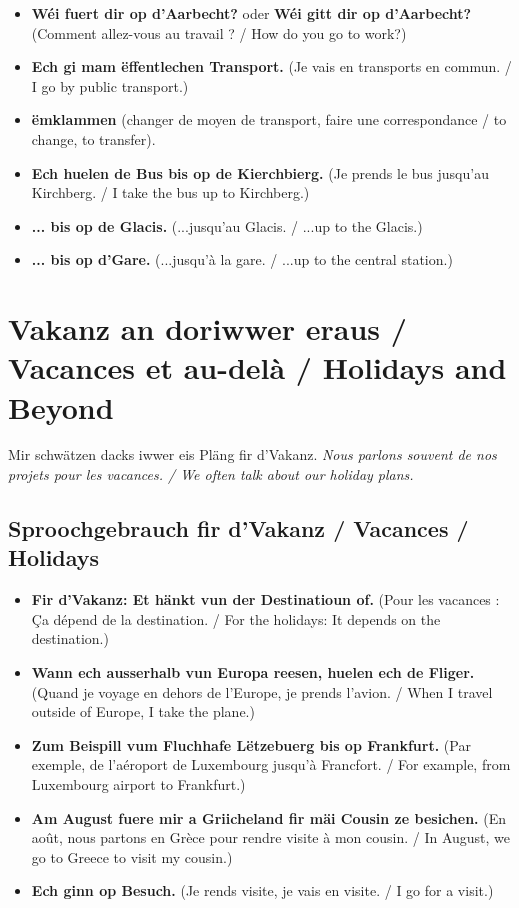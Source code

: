 \begin{itemize}
    \item \textbf{Wéi fuert dir op d'Aarbecht?} oder \textbf{Wéi gitt dir op d'Aarbecht?} (Comment allez-vous au travail ? / How do you go to work?)
    \item \textbf{Ech gi mam ëffentlechen Transport.} (Je vais en transports en commun. / I go by public transport.)
    \item \textbf{ëmklammen} (changer de moyen de transport, faire une correspondance / to change, to transfer).
    \item \textbf{Ech huelen de Bus bis op de Kierchbierg.} (Je prends le bus jusqu'au Kirchberg. / I take the bus up to Kirchberg.)
    \item \textbf{... bis op de Glacis.} (...jusqu'au Glacis. / ...up to the Glacis.)
    \item \textbf{... bis op d'Gare.} (...jusqu'à la gare. / ...up to the central station.)
\end{itemize}

\vspace{1cm}

\section{Vakanz an doriwwer eraus / Vacances et au-delà / Holidays and Beyond}

Mir schwätzen dacks iwwer eis Pläng fir d'Vakanz. \textit{Nous parlons souvent de nos projets pour les vacances. / We often talk about our holiday plans.}

\subsection{Sproochgebrauch fir d'Vakanz / Vacances / Holidays}
\begin{itemize}
    \item \textbf{Fir d'Vakanz: Et hänkt vun der Destinatioun of.} (Pour les vacances : Ça dépend de la destination. / For the holidays: It depends on the destination.)
    \item \textbf{Wann ech ausserhalb vun Europa reesen, huelen ech de Fliger.} (Quand je voyage en dehors de l'Europe, je prends l'avion. / When I travel outside of Europe, I take the plane.)
    \item \textbf{Zum Beispill vum Fluchhafe Lëtzebuerg bis op Frankfurt.} (Par exemple, de l'aéroport de Luxembourg jusqu'à Francfort. / For example, from Luxembourg airport to Frankfurt.)
    \item \textbf{Am August fuere mir a Griicheland fir mäi Cousin ze besichen.} (En août, nous partons en Grèce pour rendre visite à mon cousin. / In August, we go to Greece to visit my cousin.)
    \item \textbf{Ech ginn op Besuch.} (Je rends visite, je vais en visite. / I go for a visit.)
\end{itemize}

